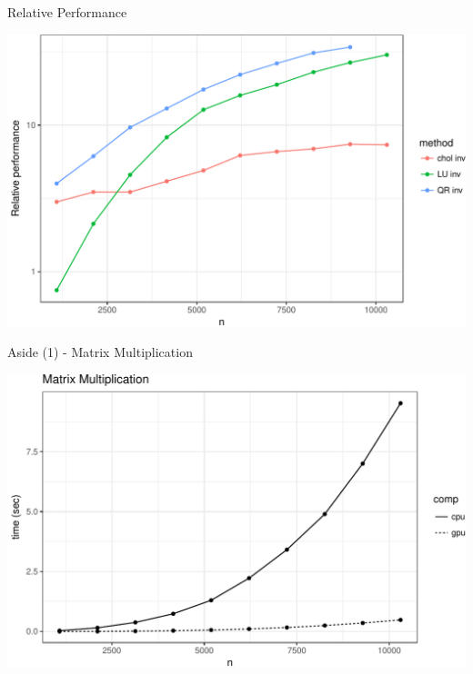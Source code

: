 \documentclass[11pt,ignorenonframetext,]{beamer}
\begin{document}
\begin{frame}{Relative Performance}
\protect\hypertarget{relative-performance}{}

\begin{center}\includegraphics[width=\textwidth]{Lec21_files/figure-beamer/unnamed-chunk-4-1} \end{center}

\end{frame}

\begin{frame}{Aside (1) - Matrix Multiplication}
\protect\hypertarget{aside-1---matrix-multiplication}{}

\begin{center}\includegraphics[width=\textwidth]{Lec21_files/figure-beamer/unnamed-chunk-5-1} \end{center}

\end{frame}
\end{document}
